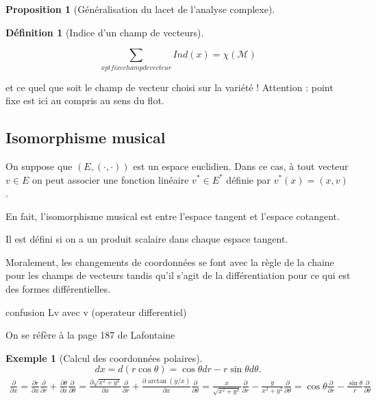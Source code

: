 \documentclass{article}
\theoremstyle{definition} %
\newtheorem{defi}{Définition}
\newtheorem{prop}{Proposition}
\newtheorem{ex}{Exemple}
\newcommand{\1}{\mathbb{1}} %
\begin{document}
\begin{prop}[Généralisation du lacet de l'analyse complexe]
\end{prop}

\begin{defi}[Indice d'un champ de vecteurs]
\end{defi}

\begin{tcolorbox}[colback=blue!5!white,colframe=blue!75!black,title=Théorème]
$$\sum_{x pt fixe champ de vecteur} Ind (x) = \chi (\mathcal{M})$$
\end{tcolorbox}
et ce quel que soit le champ de vecteur choisi sur la variété !
Attention : point fixe est ici au compris au sens du flot.

\subsection{Isomorphisme musical}

On suppose que $(E, (\cdot,\cdot) )$ est un espace euclidien. 
Dans ce cas, à tout vecteur $v\in E$ on peut associer une fonction linéaire $v^*\in E^*$ définie par $v^*(x)=(x,v)$.

En fait, l'isomorphisme musical est entre l'espace tangent et l'espace cotangent.

Il est défini si on a un produit scalaire dans chaque espace tangent.

Moralement, les changements de coordonnées se font avec la règle de la chaine pour les champs de vecteurs tandis qu'il s'agit de la différentiation pour ce qui est des formes différentielles.

confusion Lv avec v (operateur differentiel)

On se réfère à la page 187 de Lafontaine

\begin{ex}[Calcul des coordonnées polaires]

$$dx=d(r\cos\theta)=\cos\theta dr-r\sin\theta d\theta.$$
\begin{align*}\frac{\partial}{\partial x}=\frac{\partial r}{\partial x}\frac{\partial}{\partial r}+\frac{\partial \theta}{\partial x}\frac{\partial}{\partial \theta}=\frac{\partial \sqrt{x^2+y^2}}{\partial x}\frac{\partial}{\partial r}+\frac{\partial \arctan(y/x)}{\partial x}\frac{\partial}{\partial \theta}=
\frac{x}{\sqrt{x^2+y^2}}\frac{\partial}{\partial r}-\frac{y}{x^2+y^2}\frac{\partial}{\partial \theta}=
\cos\theta\frac{\partial}{\partial r}-\frac{\sin\theta}{r}\frac{\partial}{\partial \theta}
\end{align*}


\end{ex}
\end{document}

